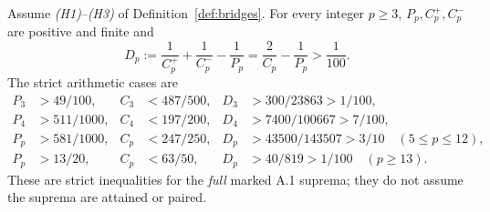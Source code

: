 \begin{theorem}\label{thm:gain}
Assume \emph{(H1)}--\emph{(H3)} of
Definition~\ref{def:bridges}.
For every integer $p\ge3$,
$P_p,C_p^+,C_p^-$ are
positive and finite and
\begin{equation}\label{eq:gain}
 D_p:=\frac1{C_p^+}+\frac1{C_p^-}
             -\frac1{P_p}
   =\frac2{C_p}-\frac1{P_p}>\frac1{100}.
\end{equation}
The strict arithmetic cases
are
\begin{align}
 P_3&>49/100,& C_3&<487/500,&
 D_3&>300/23863>1/100,\nonumber\\
 P_4&>511/1000,& C_4&<197/200,&
 D_4&>7400/100667>7/100,\label{eq:gain-cases}\\
 P_p&>581/1000,& C_p&<247/250,&
 D_p&>43500/143507>3/10\quad (5\le p\le12),
 \nonumber\\
 P_p&>13/20,& C_p&<63/50,&
 D_p&>40/819>1/100\quad (p\ge13).\nonumber
\end{align}
These are strict inequalities for the
\emph{full} marked A.1 suprema;
they do not assume the suprema
are attained or paired.
\end{theorem}
